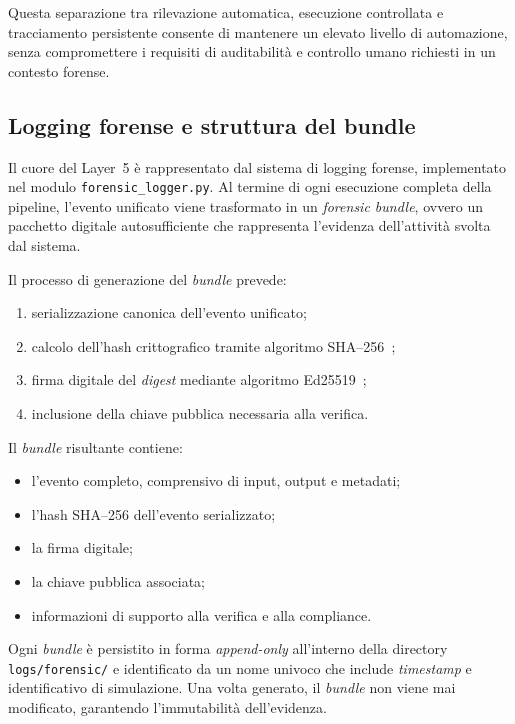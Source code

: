 Questa separazione tra rilevazione automatica, esecuzione controllata e tracciamento persistente consente di mantenere un elevato livello di automazione, senza compromettere i requisiti di auditabilità e controllo umano richiesti in un contesto forense.

\subsection{Logging forense e struttura del bundle}

Il cuore del Layer~5 è rappresentato dal sistema di logging forense, implementato nel modulo \texttt{forensic\_logger.py}.
Al termine di ogni esecuzione completa della pipeline, l’evento unificato viene trasformato in un \emph{forensic bundle}, ovvero un pacchetto digitale autosufficiente che rappresenta l’evidenza dell’attività svolta dal sistema.

Il processo di generazione del \textit{bundle} prevede:
\begin{enumerate}
	\item serializzazione canonica dell’evento unificato;
	\item calcolo dell’hash crittografico tramite algoritmo SHA--256~\cite{rfc6234_sha};
	\item firma digitale del \textit{digest} mediante algoritmo Ed25519~\cite{rfc8032_eddsa};
	\item inclusione della chiave pubblica necessaria alla verifica.
\end{enumerate}

Il \textit{bundle} risultante contiene:
\begin{itemize}
	\item l’evento completo, comprensivo di input, output e metadati;
	\item l’hash SHA--256 dell’evento serializzato;
	\item la firma digitale;
	\item la chiave pubblica associata;
	\item informazioni di supporto alla verifica e alla compliance.
\end{itemize}

Ogni \textit{bundle} è persistito in forma \textit{append-only} all’interno della directory \texttt{logs/forensic/} e identificato da un nome univoco che include \textit{timestamp} e identificativo di simulazione.
Una volta generato, il \textit{bundle} non viene mai modificato, garantendo l’immutabilità dell’evidenza.

